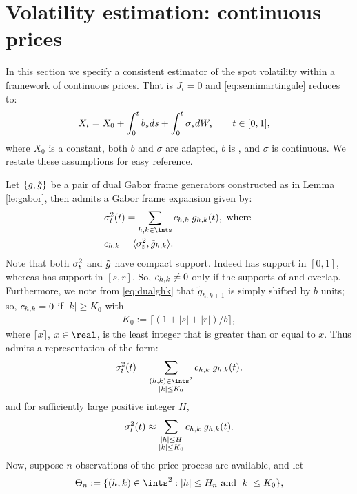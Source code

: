 \section{Volatility estimation: continuous prices } \label{sec:estimator}
In this section we specify a consistent estimator of the spot volatility within a framework of continuous prices. That is $J_t = 0$ and \eqref{eq:semimartingale} reduces to:
\begin{align}
  X_t & = X_0 + \int_0^t b_s d s + \int_0^t \sigma_s d W_s    \qquad t \in [0,1] 
  \label{eq:contsemimartingale},
\end{align}
where $X_0$ is a constant, both $b$ and $\sigma$ are adapted, $b$ is \cadlag, and $\sigma$ is continuous.    We restate these assumptions for easy reference.

Let $\{g, \tilde{g}\}$ be a pair of dual Gabor frame generators constructed as in Lemma \ref{le:gabor}, then   \sv admits a Gabor frame expansion given by:  
\begin{align}
  &\sv(t)  = \sum_{h,k \in \ints} \chk \;g_{h,k}(t), \text{ where } 
\\
&\chk = \langle \sv, \tilde{g}_{h,k} \rangle.
\end{align}
Note that both $\sigma_t^2$ and $\tilde{g}$ have compact support. Indeed \sv has support in $[0,1]$, whereas  \tg has support in $[s,r]$. So, ${c}_{h,k} \ne 0$ only if  the supports of \sv and \tghk overlap.  Furthermore, we note from \eqref{eq:dualghk} that $\tilde{g}_{h,k+1}$ is simply \tghk shifted by $b$ units; so, ${c}_{h,k} = 0$ if $|k| \ge K_0$ with 
\begin{align}
  K_0:= \lceil ( 1 + |s| + |r|)/b \rceil,
\end{align}
where $\lceil x\rceil$, $x \in \real$, is the least  integer that is greater than or equal to   $x$.  Thus \sv admits a  representation of the form: 
\begin{align}
  \sv(t) =  \sum_{\substack{(h,k) \in \ints^2\\\vert k \vert \le K_0}} \chk\;g_{h,k}(t) ,\notag
\end{align}
and  for sufficiently large positive integer $H$, 
 \begin{align}
 \sigma_t^2(t) \approx \sum_{\substack{\vert h \vert \le H \\\vert k \vert \le K_0}} {c}_{h,k}\;g_{h,k}(t). \notag
  \notag
   \label{}
 \end{align}
 Now, suppose $n$ observations of the price process are available, and let 
\begin{align}
  \Theta_n := \{(h,k) \in \ints^2 : |h| \le H_n \text{ and }|k| \le K_0\},
  \label{eq:theta}
\end{align}
